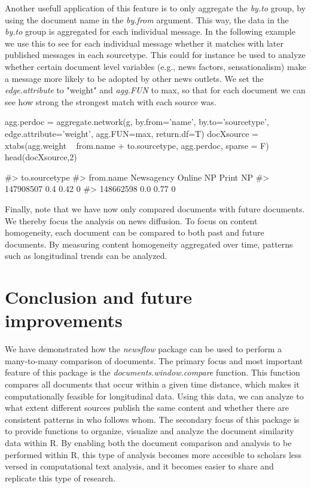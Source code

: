 Another usefull application of this feature is to only aggregate the \emph{by.to} group, by using the document name in the \emph{by.from} argument. 
This way, the data in the \emph{by.to} group is aggregated for each individual message. 
In the following example we use this to see for each individual message whether it matches with later published messages in each sourcetype.
This could for instance be used to analyze whether certain document level variables (e.g., news factors, sensationalism) make a message more likely to be adopted by other news outlets. 
We set the \emph{edge.attribute} to "weight" and \emph{agg.FUN} to max, so that for each document we can see how strong the strongest match with each source was. 


\begin{Schunk}
\begin{Sinput}
agg.perdoc = aggregate.network(g, by.from='name', by.to='sourcetype', 
                                  edge.attribute='weight', agg.FUN=max, 
                                  return.df=T)
docXsource = xtabs(agg.weight ~ from.name + to.sourcetype, agg.perdoc, sparse = F)
head(docXsource,2)
\end{Sinput}
\begin{Soutput}
#>            to.sourcetype
#> from.name   Newsagency Online NP Print NP
#>   147908507        0.4      0.42        0
#>   148662598        0.0      0.77        0
\end{Soutput}
\end{Schunk}

Finally, note that we have now only compared documents with future documents. 
We thereby focus the analysis on news diffusion.
To focus on content homogeneity, each document can be compared to both past and future documents.
By measuring content homogeneity aggregated over time, patterns such as longitudinal trends can be analyzed.

\section{Conclusion and future improvements}

We have demonstrated how the \emph{newsflow} package can be used to perform a many-to-many comparison of documents.
The primary focus and most important feature of this package is the \emph{documents.window.compare} function.
This function compares all documents that occur within a given time distance, which makes it computationally feasible for longitudinal data.
Using this data, we can analyze to what extent different sources publish the same content and whether there are consistent patterns in who follows whom.
The secondary focus of this package is to provide functions to organize, visualize and analyze the document similarity data within R. 
By enabling both the document comparison and analysis to be performed within R, this type of analysis becomes more accesible to scholars less versed in computational text analysis, and it becomes easier to share and replicate this type of research.  

